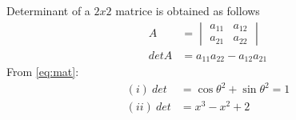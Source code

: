 \solution Determinant of a $2 x 2 $ matrice is obtained as follows
\begin{align}
A &= \begin{vmatrix} \nonumber
a_{11}& a_{12}\\
a_{21}& a_{22}
\end{vmatrix}\\
detA &= a_{11}a_{22}-a_{12}a_{21}\label{eq:mat}
\end{align}
From \ref{eq:mat}:
\begin{align}
(i)\ det &= \cos{\theta}^2 + \sin{\theta}^2 = 1 \\
(ii)\  det &= x^3 - x^2 + 2
\end{align}

